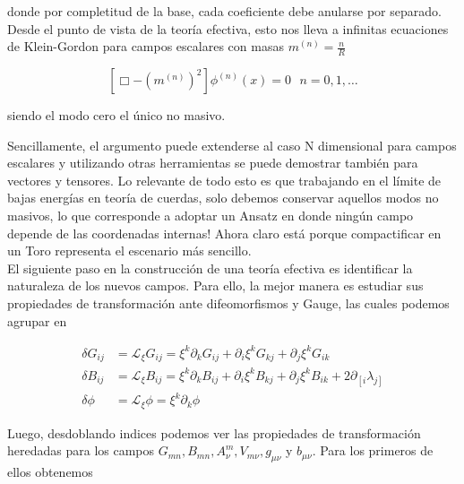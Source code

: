 \documentclass{article}
\numberwithin{equation}{section}
\begin{document}
donde por completitud de la base, cada coeficiente debe anularse por separado. Desde el punto de vista de la teoría efectiva, esto nos lleva a infinitas ecuaciones de Klein-Gordon para campos escalares con masas $ m^{(n)} = \frac{n}{R} $

\begin{equation}
\left[\Box - (m^{(n)})^2 \right] \phi^{(n)}(x) = 0 \ \ \ n=0,1,\dots
\end{equation} 

siendo el modo cero el único no masivo.

Sencillamente, el argumento puede extenderse al caso N dimensional para campos escalares y utilizando otras herramientas se puede demostrar también para vectores y tensores. Lo relevante de todo esto es que trabajando en el límite de bajas energías en teoría de cuerdas, solo debemos conservar aquellos modos no masivos, lo que corresponde a adoptar un Ansatz en donde ningún campo depende de las coordenadas internas! Ahora claro está porque compactificar en un Toro representa el escenario más sencillo.\\


El siguiente paso en la construcción de una teoría efectiva es identificar la naturaleza de los nuevos campos. Para ello, la mejor manera es estudiar sus propiedades de transformación ante difeomorfismos y Gauge, las cuales podemos agrupar en

\begin{subequations}
	\begin{align}
	\label{deltag}
	\delta G_{i j} &= \mathcal{L}_{\xi}G_{i j} = \xi^{k} \partial_k G_{i j} + \partial_i \xi^k G_{k j} + \partial_j \xi^k G_{i k}\\ 
	\label{deltab}
	\delta B_{i j} &= \mathcal{L}_{\xi}B_{i j} = \xi^{k} \partial_k B_{i j} + \partial_i \xi^k B_{k j} + \partial_j \xi^k B_{i k} + 2 \partial_{\left[ i \right.} \lambda_{\left. j \right]}\\
	\label{deltafi} 
	\delta \phi &= \mathcal{L}_{\xi} \phi = \xi^{k} \partial_k \phi
	\end{align}
\end{subequations} 

Luego, desdoblando indices podemos ver las propiedades de transformación heredadas para los campos $ G_{m n}, B_{m n}, A^m_{\nu}, V_{m \nu}, g_{\mu \nu} $ y $ b_{\mu \nu} $. Para los primeros de ellos obtenemos
\end{document}
